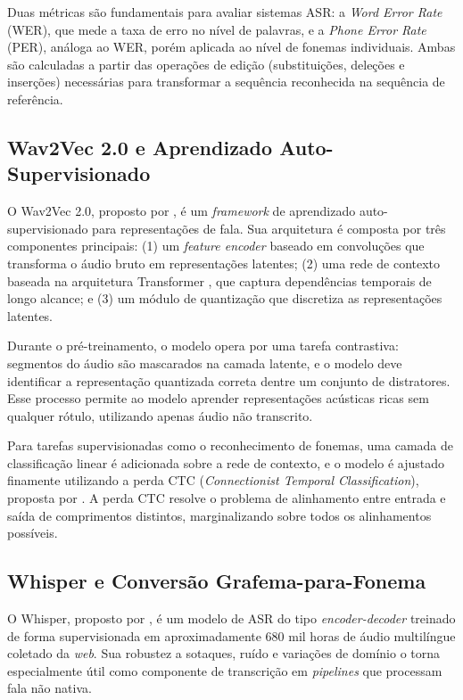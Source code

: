 \documentclass[12pt]{article}
\begin{document}
Duas métricas são fundamentais para avaliar sistemas ASR: a \textit{Word Error Rate} (WER), que mede a taxa de erro no nível de palavras, e a \textit{Phone Error Rate} (PER), análoga ao WER, porém aplicada ao nível de fonemas individuais. Ambas são calculadas a partir das operações de edição (substituições, deleções e inserções) necessárias para transformar a sequência reconhecida na sequência de referência.

\subsection{Wav2Vec 2.0 e Aprendizado Auto-Supervisionado}

O Wav2Vec 2.0, proposto por \cite{baevski2020}, é um \textit{framework} de aprendizado auto-supervisionado para representações de fala. Sua arquitetura é composta por três componentes principais: (1) um \textit{feature encoder} baseado em convoluções que transforma o áudio bruto em representações latentes; (2) uma rede de contexto baseada na arquitetura Transformer \cite{vaswani2017}, que captura dependências temporais de longo alcance; e (3) um módulo de quantização que discretiza as representações latentes.

Durante o pré-treinamento, o modelo opera por uma tarefa contrastiva: segmentos do áudio são mascarados na camada latente, e o modelo deve identificar a representação quantizada correta dentre um conjunto de distratores. Esse processo permite ao modelo aprender representações acústicas ricas sem qualquer rótulo, utilizando apenas áudio não transcrito.

Para tarefas supervisionadas como o reconhecimento de fonemas, uma camada de classificação linear é adicionada sobre a rede de contexto, e o modelo é ajustado finamente utilizando a perda CTC (\textit{Connectionist Temporal Classification}), proposta por \cite{graves2006}. A perda CTC resolve o problema de alinhamento entre entrada e saída de comprimentos distintos, marginalizando sobre todos os alinhamentos possíveis.

\subsection{Whisper e Conversão Grafema-para-Fonema}

O Whisper, proposto por \cite{radford2023}, é um modelo de ASR do tipo \textit{encoder-decoder} treinado de forma supervisionada em aproximadamente 680 mil horas de áudio multilíngue coletado da \textit{web}. Sua robustez a sotaques, ruído e variações de domínio o torna especialmente útil como componente de transcrição em \textit{pipelines} que processam fala não nativa.
\end{document}

